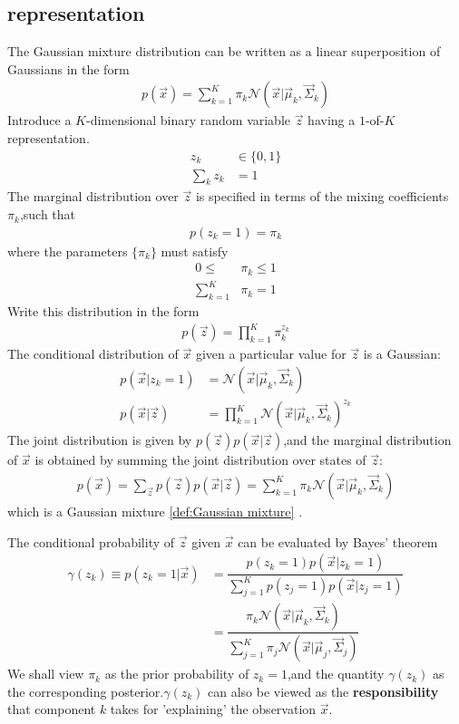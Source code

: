 \subsection{representation}
The Gaussian mixture distribution can be written as a linear superposition of Gaussians in the form
\begin{align}\label{def:Gaussian mixture}
p(\vec{x}) =
\sum_{k=1}^{K}\pi_k\mathcal{N}(\vec{x}|\vec{\mu}_k,\vec{\Sigma}_k)
\end{align}
Introduce a $K$-dimensional binary random variable $\vec{z}$ having a $1$-of-$K$ representation.
\begin{align}
z_k &\in \{ 0,1\} \\
\sum_k z_k &=1
\end{align}
The marginal distribution over $\vec{z}$ is specified in terms of the mixing coefficients $\pi_k$,such that
\begin{align}
p(z_k=1) = \pi_k
\end{align}
where the parameters $\{ \pi_k\}$ must satisfy
\begin{align}
0 \leq &\pi_k \leq 1\\
\sum_{k=1}^{K} &\pi_k = 1
\end{align}
Write this distribution in the form
\begin{align}
p(\vec{z}) = \prod_{k=1}^{K}\pi_k^{z_k}
\end{align}
The conditional distribution of $\vec{x}$ given a particular value for $\vec{z}$ is a Gaussian:
\begin{align}
p(\vec{x}|z_k=1) &= \mathcal{N}(\vec{x}|\vec{\mu}_k,\vec{\Sigma}_k) \\
p(\vec{x}|\vec{z}) 
&=\prod_{k=1}^{K}\mathcal{N}(\vec{x}|\vec{\mu}_k,\vec{\Sigma}_k)^{z_k}
\end{align}
The joint distribution is given by $p(\vec{z})p(\vec{x}|\vec{z})$,and the marginal distribution of $\vec{x}$ is obtained by summing the joint distribution over states of $\vec{z}$:
\begin{align}
p(\vec{x}) = \sum_{\vec{z}}{p(\vec{z})p(\vec{x}|\vec{z})} =
\sum_{k=1}^{K}\pi_k\mathcal{N}(\vec{x}|\vec{\mu}_k,\vec{\Sigma}_k)
\end{align}
which is a Gaussian mixture \ref{def:Gaussian mixture} .

The conditional probability of $\vec{z}$ given $\vec{x}$ can be evaluated by Bayes' theorem
\begin{align}
\label{eqn:responsibility}
\gamma(z_k)\equiv p(z_k=1|\vec{x}) 
&=\dfrac{p(z_k=1)p(\vec{x}|z_k=1)} {\sum_{j=1}^{K}p(z_j=1)p(\vec{x}|z_j=1)} \\
&=\dfrac{\pi_k \mathcal{N}(\vec{x}|\vec{\mu}_k,\vec{\Sigma}_k)}  
	{\sum_{j=1}^{K}\pi_j\mathcal{N}(\vec{x}|\vec{\mu}_j,\vec{\Sigma}_j)}
\end{align}
We shall view $\pi_k$ as the prior probability of $z_k=1$,and the quantity $\gamma(z_k)$ as the corresponding posterior.$\gamma(z_k)$ can also be viewed as the \textbf{responsibility} that component $k$ takes for 'explaining' the observation $\vec{x}$.

